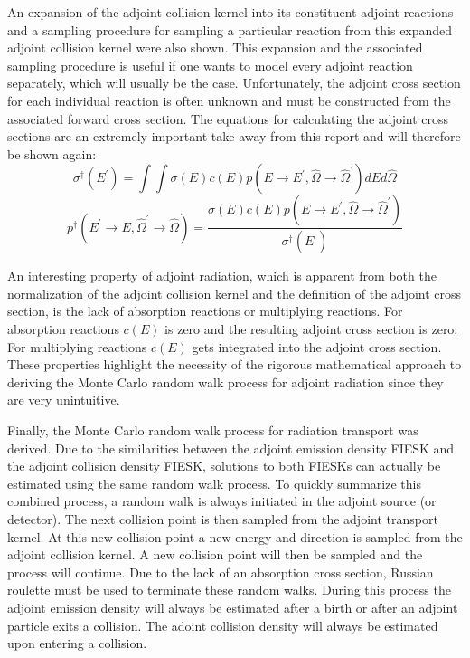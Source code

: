 An expansion of the adjoint collision kernel into its constituent adjoint
reactions and a sampling procedure for sampling a particular reaction from this
expanded adjoint collision kernel were also shown. This expansion and the 
associated sampling procedure is useful if one wants to model every
adjoint reaction separately, which will usually be the case. Unfortunately, 
the adjoint cross section for each individual reaction is often unknown and 
must be constructed from the associated forward cross section. The equations
for calculating the adjoint cross sections are an extremely important take-away 
from this report and will therefore be shown again:
\begin{equation*}
  \sigma^{\dagger}(E^{'}) = \int\int \sigma(E)c(E)
  p(E \to E^{'}, \hat{\Omega} \to \hat{\Omega}^{'})dEd\hat{\Omega}
\end{equation*}
\begin{equation*}
  p^{\dagger}(E^{'} \to E, \hat{\Omega}^{'} \to \hat{\Omega}) = 
  \frac{\sigma(E)c(E)p(E \to E^{'}, \hat{\Omega} \to \hat{\Omega}^{'})}
  {\sigma^{\dagger}(E^{'})}
\end{equation*}

An interesting property of adjoint radiation, which is apparent from both
the normalization of the adjoint collision kernel and the definition of the
adjoint cross section, is the lack of absorption reactions or multiplying
reactions. For absorption reactions $c(E)$ is zero and the resulting adjoint
cross section is zero. For multiplying reactions $c(E)$ gets integrated into
the adjoint cross section. These properties highlight the necessity of the
rigorous mathematical approach to deriving the Monte Carlo random walk process
for adjoint radiation since they are very unintuitive. 

Finally, the Monte Carlo random walk process for radiation transport was 
derived. Due to the similarities between the adjoint emission density FIESK 
and the adjoint collision density FIESK, solutions to both FIESKs can 
actually be estimated using the same random walk process. To quickly 
summarize this combined process, a random walk is always initiated in the
adjoint source (or detector). The next collision point is then sampled from
the adjoint transport kernel. At this new collision point a new energy and
direction is sampled from the adjoint collision kernel. A new collision point
will then be sampled and the process will continue. Due to the lack of an
absorption cross section, Russian roulette must be used to terminate these
random walks. During this process the adjoint emission density will always be
estimated after a birth or after an adjoint particle exits a collision. The
adoint collision density will always be estimated upon entering a collision. 

